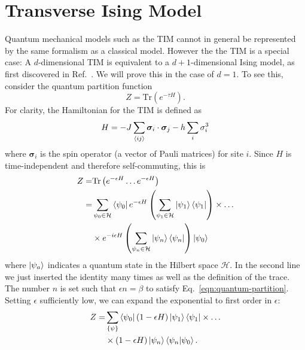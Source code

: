 \documentclass[
  amsmath,
  amssymb,
  aps,
  twocolumn,
  nofootinbib,
  floatfix,
]{revtex4-2}
\newcommand{\parens}[1]{\left ( #1 \right )}
\begin{document}
\section{Transverse Ising Model}
\label{sec:tim}

Quantum mechanical models such as the TIM cannot in general be represented by the same formalism as a classical model. However the the TIM is a special case: A $d$-dimensional TIM is equivalent to a $d+1$-dimensional Ising model, as first discovered in Ref.~\cite{schultz64two}. We will prove this in the case of $d=1$. To see this, consider the quantum partition function
\begin{equation}
  Z = \mathrm{Tr}\parens{e^{-\tau H}}.
  \label{eqn:quantum-partition}
\end{equation}
For clarity, the Hamiltonian for the TIM is defined as  
\begin{equation}
  H = -J \sum_{\braket{ij}}\bm \sigma_i \cdot \bm \sigma_j - h \sum_i\sigma_i^3
\end{equation}
where $\bm \sigma_i$ is the spin operator (a vector of Pauli matrices) for site $i$. Since $H$ is time-independent and therefore self-commuting, this is 
\begin{equation}
  \begin{split}
    Z =& \mathrm{Tr}\parens{e^{-\epsilon H}\dots e^{-\epsilon H}}\\
     =& \sum_{\psi_0\in\mathcal{H}}\bra{\psi_0}e^{-\epsilon H}\parens{\sum_{\psi_1\in\mathcal{H}}\ket{\psi_1}\bra{\psi_1}}\times\dots\\
     &\times e^{-i\epsilon H}\parens{\sum_{\psi_n\in\mathcal{H}}\ket{\psi_n}\bra{\psi_n}}\ket{\psi_0}
  \end{split}
\end{equation}
where $\ket{\psi_a}$ indicates a quantum state in the Hilbert space $\mathcal{H}$. In the second line we just inserted the identity many times as well as the definition of the trace. The number $n$ is set such that $\epsilon n = \beta$ to satisfy Eq.~\ref{eqn:quantum-partition}. Setting $\epsilon$ sufficiently low, we can expand the exponential to first order in $\epsilon$:
\begin{equation}
  \begin{split}
    Z =& \sum_{\{\psi\}}\bra{\psi_0}(1 - \epsilon H)\ket{\psi_1}\bra{\psi_1}\times\dots\\
    &\times (1 - \epsilon H)\ket{\psi_n}\braket{\psi_n|\psi_0}.
  \end{split}
  \label{eqn:partition-simplified}
\end{equation}
\end{document}
